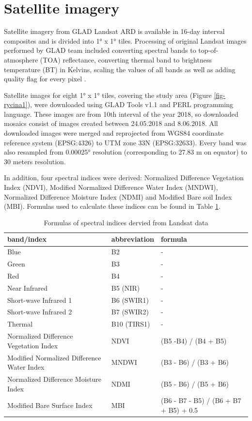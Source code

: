 \documentclass{amuthesis}
\begin{document}
\hypertarget{sec-sat}{%
\section{Satellite imagery}\label{sec-sat}}

Satellite imagery from GLAD Landsat ARD is available in 16-day interval
composites and is divided into 1° x 1° tiles. Processing of original
Landsat images performed by GLAD team included converting spectral bands
to top-of-atmosphere (TOA) reflectance, converting thermal band to
brightness temperature (BT) in Kelvins, scaling the values of all bands
as well as adding quality flag for every pixel
\autocite{potapov_landsat_2020}.

Satellite images for eight 1° x 1° tiles, covering the study area
(Figure \ref{fig-rycina1}), were downloaded using GLAD Tools v1.1 and
PERL programming language. These images are from 10th interval of the
year 2018, so downloaded mosaics consist of images created between
24.05.2018 and 8.06.2018. All downloaded images were merged and
reprojected from WGS84 coordinate reference system (EPSG:4326) to UTM
zone 33N (EPSG:32633). Every band was also resampled from 0.00025°
resolution (corresponding to 27.83 m on equator) to 30 meters
resolution.

In addition, four spectral indices were derived: Normalized Difference
Vegetation Index (NDVI), Modified Normalized Difference Water Index
(MNDWI), Normalized Difference Moisture Index (NDMI) and Modified Bare
soil Index (MBI). Formulas used to calculate these indices can be found
in Table \ref{tbl-tabela1}.

\hypertarget{tbl-tabela1}{}
\begin{table}
\caption{\label{tbl-tabela1}Formulas of spectral indices dervied from Landsat data }\tabularnewline

\centering
\begin{tabular}{|>{\raggedright\arraybackslash}p{4cm}|>{}l|>{}l|}
\toprule
\textbf{band/index} & \textbf{abbreviation} & \textbf{formula}\\
\midrule
Blue & B2 & -\\
\hline
Green & B3 & -\\
\hline
Red & B4 & -\\
\hline
Near Infrared & B5 (NIR) & -\\
\hline
Short-wave Infrared 1 & B6 (SWIR1) & -\\
\hline
Short-wave Infrared 2 & B7 (SWIR2) & -\\
\hline
Thermal & B10 (TIRS1) & -\\
\hline
Normalized Difference Vegetation Index & NDVI & (B5 -B4) / (B4 + B5)\\
\hline
Modified Normalized Difference Water Index & MNDWI & (B3 - B6) / (B3 + B6)\\
\hline
Normalized Difference Moisture Index & NDMI & (B5 - B6) / (B5 + B6)\\
\hline
Modified Bare Surface Index & MBI & (B6 - B7 - B5) / (B6 + B7 + B5) + 0.5\\
\bottomrule
\end{tabular}
\end{table}
\end{document}
